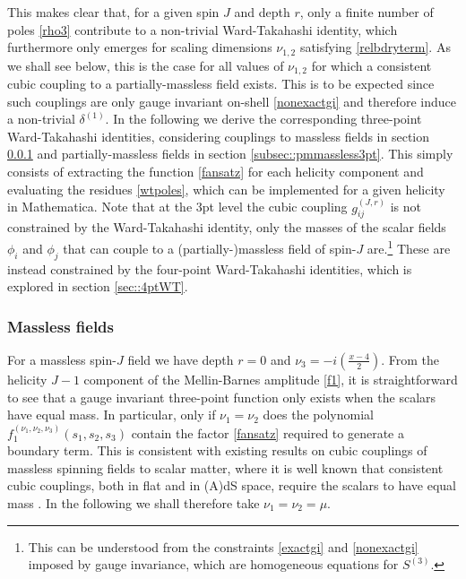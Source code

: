 \documentclass[11pt,a4paper]{article}
\begin{document}
This makes clear that, for a given spin $J$ and depth $r$, only a finite number of poles \eqref{rho3} contribute to a non-trivial Ward-Takahashi identity, which furthermore only emerges for scaling dimensions $\nu_{1,2}$ satisfying \eqref{relbdryterm}. As we shall see below, this is the case for all values \cite{Joung:2012rv,Joung:2012hz} of $\nu_{1,2}$ for which a consistent cubic coupling to a partially-massless field exists. This is to be expected since such couplings are only gauge invariant on-shell \eqref{nonexactgi} and therefore induce a non-trivial $\delta^{(1)}$. In the following we derive the corresponding three-point Ward-Takahashi identities, considering couplings to massless fields in section \ref{subsec::massless3pt} and partially-massless fields in section \ref{subsec::pmmassless3pt}. This simply consists of extracting the function \eqref{fansatz} for each helicity component and evaluating the residues \eqref{wtpoles}, which can be implemented for a given helicity in Mathematica. Note that at the 3pt level the cubic coupling $g^{\left(J,r\right)}_{ij}$ is not constrained by the Ward-Takahashi identity, only the masses of the scalar fields $\phi_i$ and $\phi_j$ that can couple to a (partially-)massless field of spin-$J$ are.\footnote{This can be understood from the constraints \eqref{exactgi} and \eqref{nonexactgi} imposed by gauge invariance, which are homogeneous equations for $S^{\left(3\right)}$.} These are instead constrained by the four-point Ward-Takahashi identities, which is explored in section \ref{sec::4ptWT}.



\subsubsection{Massless fields}
\label{subsec::massless3pt}

For a massless spin-$J$ field we have depth $r=0$ and $\nu_3 = -i \left(\frac{x-4}{2}\right)$. From the helicity $J-1$ component of the Mellin-Barnes amplitude \eqref{f1}, it is straightforward to see that a gauge invariant three-point function only exists when the scalars have equal mass. In particular, only if $\nu_1 = \nu_2$ does the polynomial $f^{\left(\nu_1,\nu_2,\nu_3\right)}_{1}\left(s_1,s_2,s_3\right)$ contain the factor \eqref{fansatz} required to generate a boundary term. This is consistent with existing results on cubic couplings of massless spinning fields to scalar matter, where it is well known that consistent cubic couplings, both in flat and in (A)dS space, require the scalars to have equal mass \cite{Berends:1985xx,Bekaert:2010hk}. In the following we shall therefore take $\nu_1 = \nu_2 = \mu$.
\end{document}

